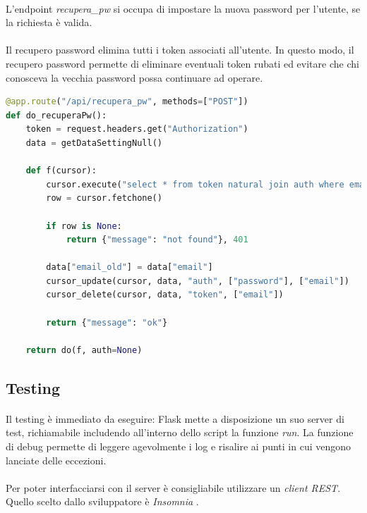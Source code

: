 \documentclass[11pt,a4paper,english]{article}
\begin{document}
\paragraph{} L'endpoint \emph{recupera\_pw} si occupa di impostare la nuova password per l'utente, se la richiesta è valida.

\paragraph{} Il recupero password elimina tutti i token associati all'utente. In questo modo, il recupero password permette di eliminare eventuali token rubati ed evitare che chi conosceva la vecchia password possa continuare ad operare. 

\begin{lstlisting}[language=Python, caption=POST recupera\_pw]
@app.route("/api/recupera_pw", methods=["POST"])
def do_recuperaPw():
    token = request.headers.get("Authorization")
    data = getDataSettingNull()

    def f(cursor):
        cursor.execute("select * from token natural join auth where email=%s and token=%s", (data["email"], token))
        row = cursor.fetchone()

        if row is None:
            return {"message": "not found"}, 401

        data["email_old"] = data["email"]
        cursor_update(cursor, data, "auth", ["password"], ["email"])
        cursor_delete(cursor, data, "token", ["email"])

        return {"message": "ok"}

    return do(f, auth=None)
\end{lstlisting}


\subsection{Testing}

\paragraph{} Il testing è immediato da eseguire: Flask mette a disposizione un suo server di test, richiamabile includendo all'interno dello script la funzione \emph{run}. La funzione di debug permette di leggere agevolmente i log e risalire ai punti in cui vengono lanciate delle eccezioni.

\paragraph{} Per poter interfacciarsi con il server è consigliabile utilizzare un \emph{client REST}. Quello scelto dallo sviluppatore è \emph{Insomnia} \cite{insomnia}.
\end{document}
